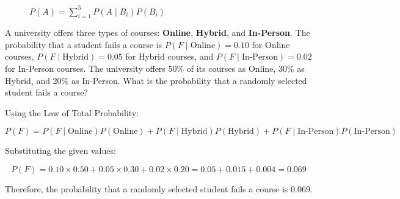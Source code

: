 \begin{figure}[h!]
    \centering
    \caption{$P(A) = \sum_{i=1}^{5} P(A \mid B_i) P(B_i)$}
    \label{fig:decoAmulB}
\end{figure}

\begin{example}
    A university offers three types of courses: \textbf{Online}, \textbf{Hybrid}, and \textbf{In-Person}. The probability that a student fails a course is \( P(F \mid \text{Online}) = 0.10 \) for Online courses, \( P(F \mid \text{Hybrid}) = 0.05 \) for Hybrid courses, and \( P(F \mid \text{In-Person}) = 0.02 \) for In-Person courses. The university offers 50\% of its courses as Online, 30\% as Hybrid, and 20\% as In-Person. What is the probability that a randomly selected student fails a course?
\end{example}

\begin{solution}
    Using the Law of Total Probability:

    \[
    P(F) = P(F \mid \text{Online}) P(\text{Online}) + P(F \mid \text{Hybrid}) P(\text{Hybrid}) + P(F \mid \text{In-Person}) P(\text{In-Person})
    \]

    Substituting the given values:

    \[
    P(F) = 0.10 \times 0.50 + 0.05 \times 0.30 + 0.02 \times 0.20 = 0.05 + 0.015 + 0.004 = 0.069
    \]

    Therefore, the probability that a randomly selected student fails a course is 0.069.
\end{solution}


